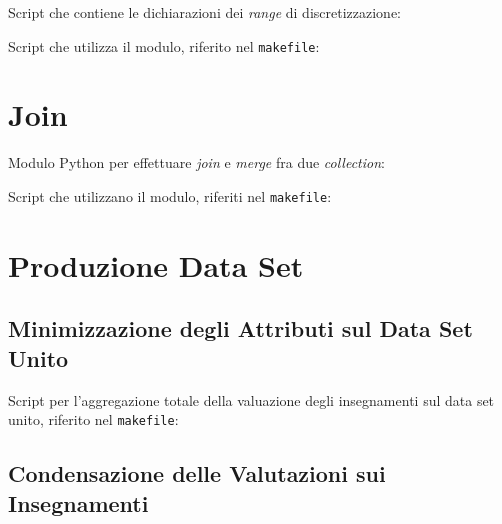 \begin{appendices}
        \vspace{0.8 cm}

        Script che contiene le dichiarazioni dei \textit{range} di discretizzazione:
        

        \vspace{0.8 cm}

        Script che utilizza il modulo, riferito nel \texttt{makefile}: \\
        

    \section{Join}
    \label{appendix:merge}
        Modulo Python per effettuare \textit{join} e \textit{merge} fra due \textit{collection}: \\
        

        \vspace{0.8 cm}

        Script che utilizzano il modulo, riferiti nel \texttt{makefile}: \\
        
        

    \section{Produzione Data Set}

        \subsection{Minimizzazione degli Attributi sul Data Set Unito}
        \label{appendix:min}

            Script per l'aggregazione totale della valuazione degli insegnamenti sul data set unito, riferito nel \texttt{makefile}: \\
            

        \subsection{Condensazione delle Valutazioni sui Insegnamenti}
        \label{appendix:eval}


\end{appendices}
